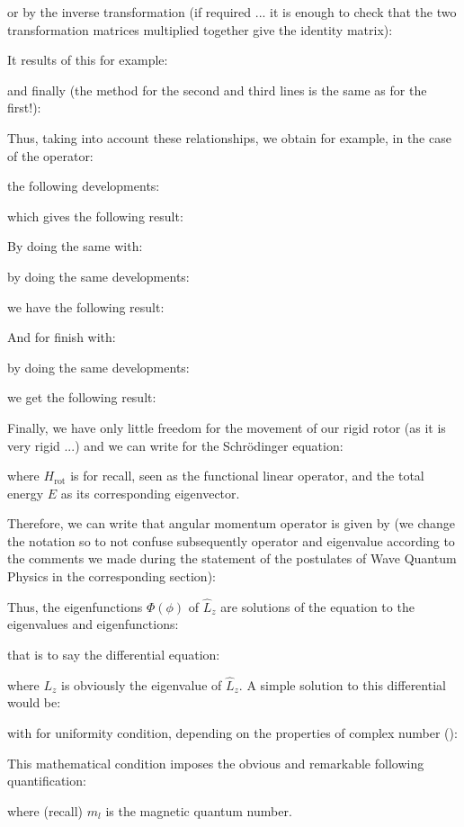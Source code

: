 	or by the inverse transformation (if required ... it is enough to check that the two transformation matrices multiplied together give the identity matrix):
	
	It results of this for example:
	
	and finally (the method for the second and third lines is the same as for the first!):
	
	Thus, taking into account these relationships, we obtain for example, in the case of the operator:
	
	the following developments:
	
	which gives the following result:
	
	By doing the same with:
	
	by doing the same developments:
	
	we have the following result:
	
	And for finish with:
	
	by doing the same developments:
	
	we get the following result:
	
	Finally, we have only little freedom for the movement of our rigid rotor (as it is very rigid ...) and we can write for the Schrödinger equation:
	
	where $H_\text{rot}$ is for recall, seen as the functional linear operator, and the total energy $E$ as its corresponding eigenvector.

	Therefore, we can write that angular momentum operator is given by (we change the notation so to not confuse subsequently operator and eigenvalue according to the comments we made during the statement of the postulates of Wave Quantum Physics in the corresponding section):
	
	Thus, the eigenfunctions $\Phi(\phi)$ of $\hat{L}_z$ are solutions of the equation to the eigenvalues and eigenfunctions:
	
	that is to say the differential equation:
	
	where $L_z$ is obviously the eigenvalue of $\hat{L}_z$. A simple solution to this differential would be:
	
	with for uniformity condition, depending on the properties of complex number ():
	
	This mathematical condition imposes the obvious and remarkable following quantification:
	
	where (recall) $m_l$ is the magnetic quantum number.

